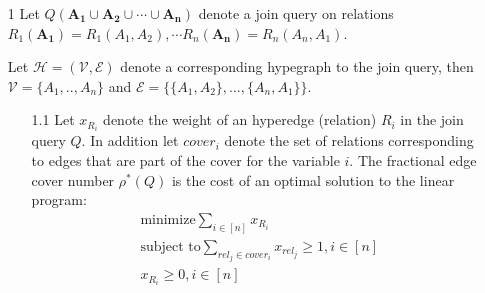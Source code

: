 \documentclass[10pt,a4paper]{article}
\begin{document}
\begin{enumerate}
\item[1]
Let $Q(\mathbf{A_1} \cup \mathbf{A_2} \cup \cdots \cup \mathbf{A_n})$ denote a join query on relations $R_1(\mathbf{A_1})=R_1(A_1, A_2), \cdots R_n(\mathbf{A_n})=R_n(A_n, A_1)$.

Let $\mathcal{H}=(\mathcal{V}, \mathcal{E})$ denote a corresponding hypegraph to the join query, then $\mathcal{V} = \{A_1, .., A_n\}$ and $\mathcal{E} =\{\{A_1, A_2\}, ..., \{A_n, A_1\}\}$.
\begin{enumerate}
\item[1.1]
Let $x_{R_i}$ denote the weight of an hyperedge (relation) $R_i$ in the join query $Q$. In addition let $cover_i$ denote the set of relations corresponding to edges that are part of the cover for the variable $i$. The fractional edge cover number $\rho^{*}(Q)$ is the cost of an optimal solution to the linear program:
\begin{eqnarray}
\text{minimize} \sum_{i\in [n]} x_{R_i}  \label{eq:minimize} \\
\text{subject to} \sum_{rel_j \in cover_i} x_{rel_j} \geq 1, i \in [n]  \label{eq:inequalities}\\
x_{R_i} \geq 0, i \in [n] \nonumber
\end{eqnarray}


\end{enumerate}
\end{enumerate}
\end{document}
